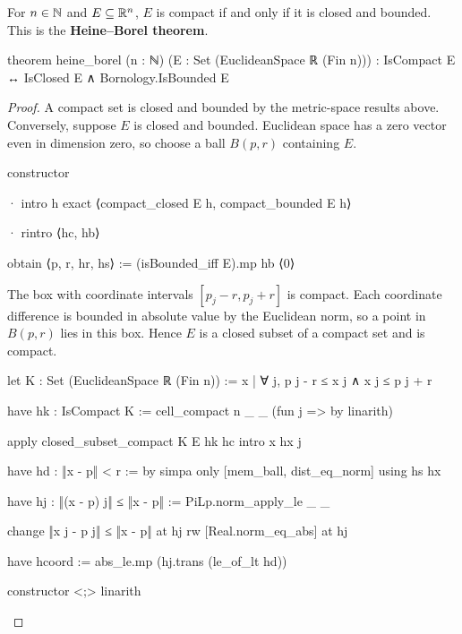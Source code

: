 \begin{theorem}
  \label{an1:thm:heine-borel-theorem}
  For $n\in\mathbb{N}$ and $E\subseteq\mathbb{R}^{n}$, $E$ is compact if and only if it is closed and bounded.
  This is the \textbf{Heine--Borel theorem}.

  \begin{lean}
    theorem heine_borel (n : ℕ) (E : Set (EuclideanSpace ℝ (Fin n))) :
        IsCompact E ↔ IsClosed E ∧ Bornology.IsBounded E
  \end{lean}
\end{theorem}

\begin{proof}
  A compact set is closed and bounded by the metric-space results above.
  Conversely, suppose $E$ is closed and bounded.
  Euclidean space has a zero vector even in dimension zero, so choose a ball $B(p,r)$ containing
  $E$.

  \begin{lean}
    constructor

    · intro h
      exact ⟨compact_closed E h, compact_bounded E h⟩

    · rintro ⟨hc, hb⟩

      obtain ⟨p, r, hr, hs⟩ := (isBounded_iff E).mp hb ⟨0⟩
  \end{lean}

  The box with coordinate intervals $[p_j-r,p_j+r]$ is compact.
  Each coordinate difference is bounded in absolute value by the Euclidean norm, so a point in
  $B(p,r)$ lies in this box.
  Hence $E$ is a closed subset of a compact set and is compact.

  \begin{lean}
    let K : Set (EuclideanSpace ℝ (Fin n)) := {x | ∀ j, p j - r ≤ x j ∧ x j ≤ p j + r}

    have hk : IsCompact K := cell_compact n _ _ (fun j => by linarith)

    apply closed_subset_compact K E hk hc
    intro x hx j

    have hd : ‖x - p‖ < r := by
      simpa only [mem_ball, dist_eq_norm] using hs hx

    have hj : ‖(x - p) j‖ ≤ ‖x - p‖ := PiLp.norm_apply_le _ _

    change ‖x j - p j‖ ≤ ‖x - p‖ at hj
    rw [Real.norm_eq_abs] at hj

    have hcoord := abs_le.mp (hj.trans (le_of_lt hd))

    constructor <;> linarith
  \end{lean}

\end{proof}
